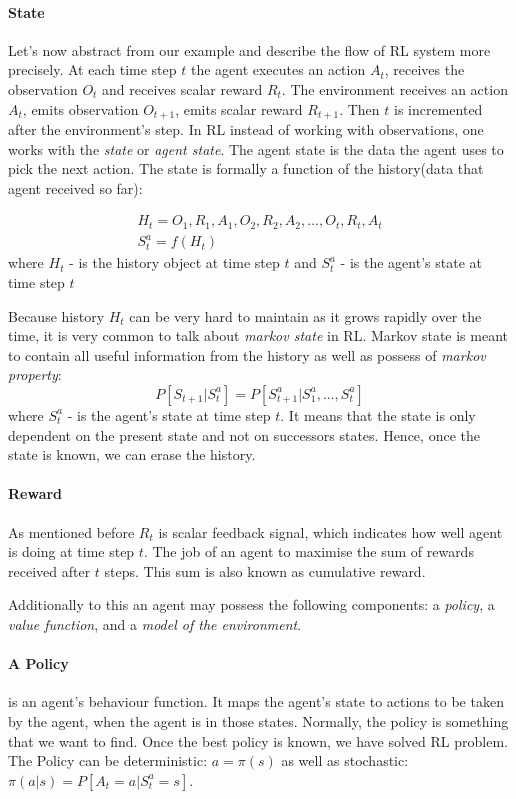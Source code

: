 \paragraph{State} \label{sec:comp_rl}
Let's now abstract from our example and describe the flow of RL system more precisely.
At each time step $t$ the agent executes an action $A_t$, receives the observation $O_t$
and receives scalar reward $R_t$. The environment receives an action $A_t$,
emits observation $O_{t+1}$, emits scalar reward $R_{t+1}$. Then $t$ is incremented
after the environment's step. In RL instead of working with observations, one works
with the \emph{state} or \emph{agent state}. The agent state is the data the agent uses
to pick the next action. The state is formally a function of the
history(data that agent received so far):

\begin{align} \label{eq:rl_state}
	H_t = O_1, R_1, A_1, O_2, R_2, A_2, ..., O_t, R_t, A_t \\
	S_t^a = f(H_t)
\end{align}
where $H_t$ - is the history object at time step $t$ and
$S_t^a$ - is the agent's state at time step $t$

Because history $H_t$ can be very hard to maintain as it grows rapidly over the time,
it is very common to talk about \emph{markov state} in RL. Markov state is meant
to contain all useful information from the history as well as possess of \emph{markov property}:
\begin{equation} \label{eq:markov_property}
	P[S_{t+1} | S_t^a] = P[S_{t+1}^a | S_1^a, ..., S_t^a]
\end{equation}
where $S_t^a$ - is the agent's state at time step $t$.
It means that the state is only dependent on the present state and not on
successors states. Hence, once the state is known, we can erase the history.

\paragraph{Reward} As mentioned before $R_t$ is scalar feedback signal, which
indicates how well agent is doing at time step $t$. The job of an agent to
maximise the sum of rewards received after $t$ steps. This sum is also known as
cumulative reward.

Additionally to this an agent may possess the following components:
a \emph{policy},
a \emph{value function}, and
a \emph{model of the environment}.

\paragraph{A Policy} is an agent's behaviour function. It maps the agent's state
to actions to be taken by the agent, when the agent is in those states. Normally, the policy is
something that we want to find. Once the best policy is known, we have solved RL problem.
The Policy can be deterministic: $a = \pi (s)$
as well as stochastic: $\pi(a|s) = P[A_t = a|S_t^a = s]$.

